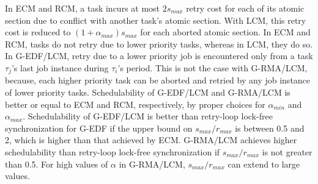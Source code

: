 In ECM and RCM, a task incurs at most $2s_{max}$ retry cost for each of its atomic section due to conflict
with another task's atomic section. With LCM, this retry cost is reduced to $(1+\alpha_{max})s_{max}$ for each aborted atomic section. In ECM and RCM, tasks do not retry due to lower priority tasks, whereas in LCM, they do so. In G-EDF/LCM, retry due to a lower priority job is encountered only from a task $\tau_{j}$'s last job instance 
during $\tau_{i}$'s period. This is not the case with G-RMA/LCM, because,  each higher priority task can be aborted and retried by any job instance of lower priority tasks. Schedulability of G-EDF/LCM and G-RMA/LCM is better or equal to ECM and RCM, respectively, by proper choices for $\alpha_{min}$ and $\alpha_{max}$. Schedulability of G-EDF/LCM is better than retry-loop lock-free synchronization for G-EDF if the upper bound on $s_{max}/r_{max}$ is between 0.5 and 2, which is higher than that achieved by ECM. 
G-RMA/LCM achieves higher schedulability than retry-loop lock-free synchronization if $s_{max}/r_{max}$ is not greater than 0.5. For high values of $\alpha$ in G-RMA/LCM, $s_{max}/r_{max}$ can extend to large values.
